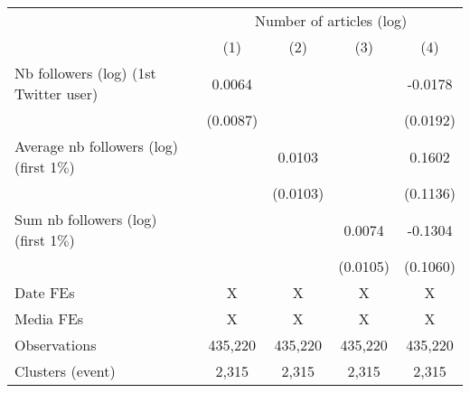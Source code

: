 {
\def\sym#1{\ifmmode^{#1}\else\(^{#1}\)\fi}
\begin{tabular}{l*{4}{c}}
\hline\hline
                    &\multicolumn{4}{c}{Number of articles (log)}                                           \\\cmidrule(lr){2-5}
                    &\multicolumn{1}{c}{(1)}         &\multicolumn{1}{c}{(2)}         &\multicolumn{1}{c}{(3)}         &\multicolumn{1}{c}{(4)}         \\
\hline
Nb followers (log) (1st Twitter user)&      0.0064         &                     &                     &     -0.0178         \\
                    &    (0.0087)         &                     &                     &    (0.0192)         \\
Average nb followers (log) (first 1$\%$)&                     &      0.0103         &                     &      0.1602         \\
                    &                     &    (0.0103)         &                     &    (0.1136)         \\
Sum nb followers (log) (first 1$\%$)&                     &                     &      0.0074         &     -0.1304         \\
                    &                     &                     &    (0.0105)         &    (0.1060)         \\
\hline
Date FEs            &           X         &           X         &           X         &           X         \\
Media FEs           &           X         &           X         &           X         &           X         \\
Observations        &     435,220         &     435,220         &     435,220         &     435,220         \\
Clusters (event)    &       2,315         &       2,315         &       2,315         &       2,315         \\
\hline\hline
\end{tabular}
}
